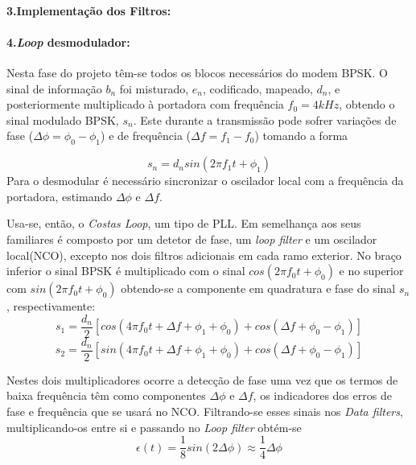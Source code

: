 \documentclass[11pt]{article}
\numberwithin{equation}{section}
\begin{document}
\paragraph{3.Implementação dos Filtros:} \hspace{0pt}


\paragraph{4.\textit{Loop} desmodulador:} \hspace{0pt}
 
Nesta fase do projeto têm-se todos os blocos necessários do modem BPSK. O sinal de informação $b_n$ foi misturado, $e_n$, codificado, mapeado, $d_n$, e posteriormente multiplicado à portadora com frequência $f_0 = 4kHz$, obtendo o sinal modulado BPSK, $s_n$. Este durante a transmissão pode sofrer variações de fase ($\Delta\phi=\phi_0-\phi_1$) e de frequência ($\Delta f = f_1-f_0$) tomando a forma 

\begin{equation}
	s_n=d_nsin(2\pi f_1t+ \phi_1)
\end{equation}
 Para o desmodular é necessário sincronizar o oscilador local com a frequência da portadora, estimando $\Delta\phi$ e $\Delta f$.

Usa-se, então, o \textit{Costas Loop}, um tipo de PLL. Em semelhança aos seus familiares é composto por um detetor de fase, um \textit{loop filter} e um oscilador local(NCO), excepto nos dois filtros adicionais em cada ramo exterior. No braço inferior o sinal BPSK é multiplicado com o sinal $cos(2\pi f_0t+\phi_0)$ e no superior com $sin(2\pi f_0t+ \phi_0)$ obtendo-se a componente em quadratura e fase do sinal $s_n$, respectivamente: 
\begin{equation}
	s_1=\frac{d_n}{2}[cos(4\pi f_0t+\Delta f+\phi_1+\phi_0)+cos(\Delta f+\phi_0-\phi_1)]
\end{equation}
\begin{equation}
	s_2=\frac{d_n}{2}[sin(4\pi f_0t+\Delta f+\phi_1+\phi_0)+cos(\Delta f+\phi_0-\phi_1)]
\end{equation} 

Nestes dois multiplicadores ocorre a detecção de fase uma vez que os termos de baixa frequência têm como componentes $\Delta\phi$ e $\Delta f$, os indicadores dos erros de fase e frequência que se usará no NCO. Filtrando-se esses sinais nos \textit{Data filters}, multiplicando-os entre si e passando no \textit{Loop filter} obtém-se 
\begin{equation}
	\epsilon(t)=\frac{1}{8}sin(2\Delta\phi)\approx\frac{1}{4}\Delta\phi
\end{equation}
 
\end{document}
